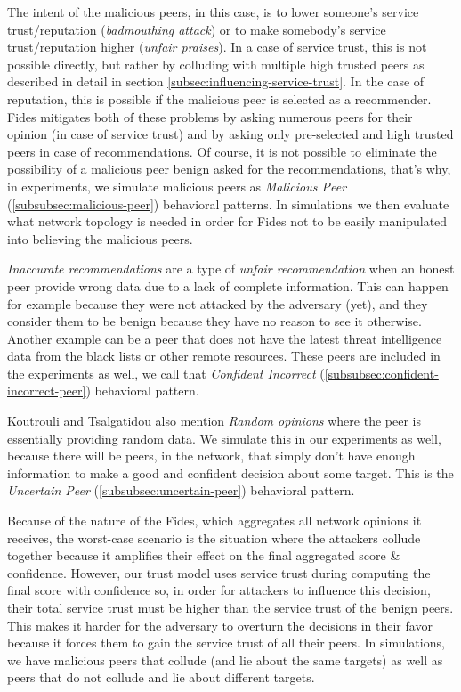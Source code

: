 The intent of the malicious peers, in this case, is to lower someone's service trust/reputation (\textit{badmouthing attack}) or to make somebody's service trust/reputation higher (\textit{unfair praises}).
In a case of service trust, this is not possible directly, but rather by colluding with multiple high trusted peers as described in detail in section \ref{subsec:influencing-service-trust}.
In the case of reputation, this is possible if the malicious peer is selected as a recommender.
Fides mitigates both of these problems by asking numerous peers for their opinion (in case of service trust) and by asking only pre-selected and high trusted peers in case of recommendations.
Of course, it is not possible to eliminate the possibility of a malicious peer benign asked for the recommendations, that's why, in experiments, we simulate malicious peers as \textit{Malicious Peer} (\ref{subsubsec:malicious-peer}) behavioral patterns.
In simulations we then evaluate what network topology is needed in order for Fides not to be easily manipulated into believing the malicious peers.

\textit{Inaccurate recommendations} are a type of \textit{unfair recommendation} when an honest peer provide wrong data due to a lack of complete information.
This can happen for example because they were not attacked by the adversary (yet), and they consider them to be benign because they have no reason to see it otherwise.
Another example can be a peer that does not have the latest threat intelligence data from the black lists or other remote resources.
These peers are included in the experiments as well, we call that \textit{Confident Incorrect} (\ref{subsubsec:confident-incorrect-peer}) behavioral pattern.

Koutrouli and Tsalgatidou \cite{KOUTROULI201247} also mention \textit{Random opinions} where the peer is essentially providing random data.
We simulate this in our experiments as well, because there will be peers, in the network, that simply don't have enough information to make a good and confident decision about some target.
This is the \textit{Uncertain Peer} (\ref{subsubsec:uncertain-peer}) behavioral pattern.

Because of the nature of the Fides, which aggregates all network opinions it receives, the worst-case scenario is the situation where the attackers collude together because it amplifies their effect on the final aggregated score \& confidence.
However, our trust model uses service trust during computing the final score with confidence so, in order for attackers to influence this decision, their total service trust must be higher than the service trust of the benign peers.
This makes it harder for the adversary to overturn the decisions in their favor because it forces them to gain the service trust of all their peers.
In simulations, we have malicious peers that collude (and lie about the same targets) as well as peers that do not collude and lie about different targets.

